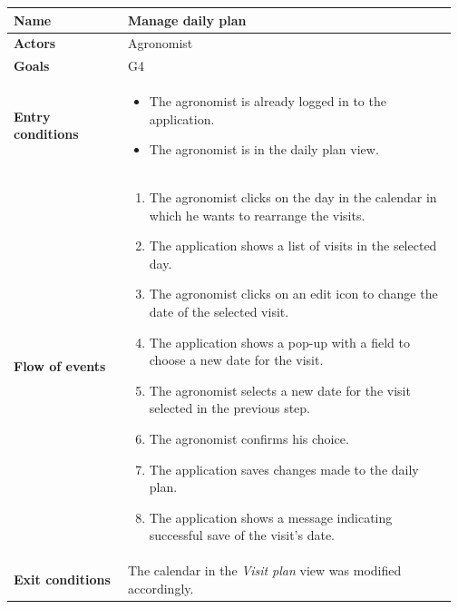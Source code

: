 \begin{table}[H]
    \centering
	\begin{tabular}{@{}p{0.25\linewidth} p{0.72\linewidth}@{}}
        \toprule
		\textbf{Name}               & Manage daily plan\\
		\midrule
		\textbf{Actors}             & Agronomist\\
		\midrule
		\textbf{Goals}              & G4 \\
		\midrule
		
		\textbf{Entry conditions}   & \begin{itemize}[leftmargin=.4cm,noitemsep,topsep=0pt,before=\vspace{-3mm},after=\vspace{-4mm}]
		    \item The agronomist is already logged in to the application.
		    \item The agronomist is in the daily plan view.
		\end{itemize}\\
		\midrule
		
		\textbf{Flow of events}     & \begin{enumerate}[leftmargin=.4cm,noitemsep,topsep=0pt,before=\vspace{-3mm},after=\vspace{-4mm}]
		    \item The agronomist clicks on the day in the calendar in which he wants to rearrange the visits.
		    \item The application shows a list of visits in the selected day.
		    \item The agronomist clicks on an edit icon to change the date of the selected visit.
		    \item The application shows a pop-up with a field to choose a new date for the visit.
		    \item The agronomist selects a new date for the visit selected in the previous step.
		    \item The agronomist confirms his choice.
		    \item The application saves changes made to the daily plan.
		    \item The application shows a message indicating successful save of the visit's date.
		\end{enumerate}\\
		\midrule
		\textbf{Exit conditions}    & The calendar in the \textit{Visit plan} view was modified accordingly. \\
		\midrule
		

\end{tabular}
\end{table}
